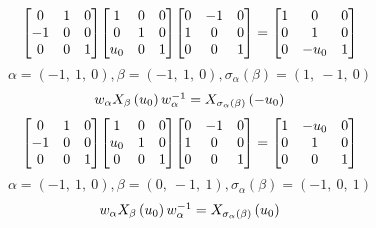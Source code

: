 \documentclass[11pt]{article}
\theoremstyle{definition}
\begin{document}
\[
\scaletoalign{\textwidth}{{\left[\begin{matrix}0 & 1 & 0\\-1 & 0 & 0\\0 & 0 & 1\end{matrix}\right]} {\left[\begin{matrix}1 & 0 & 0\\0 & 1 & 0\\u_{0} & 0 & 1\end{matrix}\right]} {\left[\begin{matrix}0 & -1 & 0\\1 & 0 & 0\\0 & 0 & 1\end{matrix}\right]} = {\left[\begin{matrix}1 & 0 & 0\\0 & 1 & 0\\0 & - u_{0} & 1\end{matrix}\right]}}
\]
\[
\alpha = \left( -1, \  1, \  0\right), \beta = \left( -1, \  1, \  0\right), \sigma_{\alpha}(\beta) = \left( 1, \  -1, \  0\right)
\]
\[
\scaletoalign{\textwidth}{w_{\alpha} X_{\beta}\left(u_{0}\right) w_{\alpha}^{-1} = X_{\sigma_{\alpha}\left(\beta\right)}\left(- u_{0}\right)}
\]
\[
\scaletoalign{\textwidth}{{\left[\begin{matrix}0 & 1 & 0\\-1 & 0 & 0\\0 & 0 & 1\end{matrix}\right]} {\left[\begin{matrix}1 & 0 & 0\\u_{0} & 1 & 0\\0 & 0 & 1\end{matrix}\right]} {\left[\begin{matrix}0 & -1 & 0\\1 & 0 & 0\\0 & 0 & 1\end{matrix}\right]} = {\left[\begin{matrix}1 & - u_{0} & 0\\0 & 1 & 0\\0 & 0 & 1\end{matrix}\right]}}
\]
\[
\alpha = \left( -1, \  1, \  0\right), \beta = \left( 0, \  -1, \  1\right), \sigma_{\alpha}(\beta) = \left( -1, \  0, \  1\right)
\]
\[
\scaletoalign{\textwidth}{w_{\alpha} X_{\beta}\left(u_{0}\right) w_{\alpha}^{-1} = X_{\sigma_{\alpha}\left(\beta\right)}\left(u_{0}\right)}
\]
\end{document}
